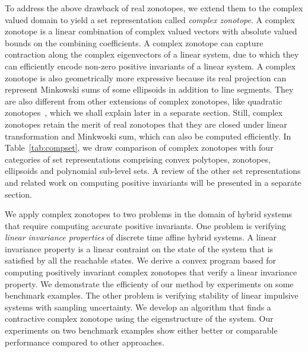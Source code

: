 To address the above drawback of real zonotopes, we extend them to the
complex valued domain to yield a set representation called {\it
complex zonotope}.  A complex zonotope is a linear combination of
complex valued vectors with absolute valued bounds on the combining
coefficients.  A complex zonotope can capture contraction along the
complex eigenvectors of a linear system, due to which they can
efficiently encode non-zero positive invariants of a linear system.  A
complex zonotope is also geometrically more expressive because its
real projection can represent Minkowski sums of some
ellipsoids in addition to line segments.  They are also different from
other extensions of complex zonotopes, like quadratic
zonotopes~\cite{DBLP:conf/aplas/AdjeGW15}, which we shall explain
later in a separate section.  Still, complex zonotopes retain the
merit of real zonotopes that they are closed under linear
transformation and Minkwoski sum, which can also be computed
efficiently.  In Table~\ref{tab:compset}, we draw comparison of
complex zonotopes with four categories of set representations
comprising convex polytopes, zonotopes, ellipsoids and polynomial
sub-level sets.  A review of the other set representations and related
work on computing positive invariants will be presented in a separate
section.

We apply complex zonotopes to two problems in the domain of hybrid
systems that require computing accurate positive invariants.  One
problem is verifying \emph{linear invariance properties} of discrete
time affine hybrid systems.  A linear invariance property is a linear
contraint on the state of the system that is satisfied by all the
reachable states.  We derive a convex program based for computing
positively invariant complex zonotopes that verify a linear invariance
property.  We demonstrate the efficienty of our method by experiments
on some benchmark examples.  The other problem is verifying stability
of linear impulsive systems with sampling uncertainty.  We develop an
algorithm that finds a contractive complex zonotope using the
eigenstructure of the system.  Our experiments on two benchmark
examples show either better or comparable performance compared to
other approaches.




